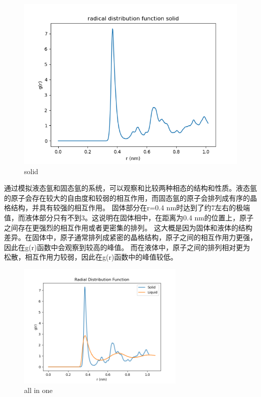 \documentclass[12pt, a4paper, oneside]{ctexart}
\begin{document}
\begin{spacing}{2.0}
\begin{figure}[H]
\begin{minipage}[t]{0.5\linewidth}
        \includegraphics[scale=0.5]{radial distribution function solid.png}
        \caption{solid}
        \label{fig:side:b}
      \end{minipage}
\end{figure}


通过模拟液态氩和固态氩的系统，可以观察和比较两种相态的结构和性质。液态氩的原子会存在较大的自由度和较弱的相互作用，而固态氩的原子会排列成有序的晶格结构，并具有较强的相互作用。
固体部分在r=0.4 nm时达到了约7左右的极端值，而液体部分只有不到3。这说明在固体相中，在距离为0.4 nm的位置上，原子之间存在更强烈的相互作用或者更密集的排列。
这大概是因为固体和液体的结构差异。在固体中，原子通常排列成紧密的晶格结构，原子之间的相互作用力更强，因此在g(r)函数中会观察到较高的峰值。
而在液体中，原子之间的排列相对更为松散，相互作用力较弱，因此在g(r)函数中的峰值较低。
\begin{figure}[H]
	\centering
	\includegraphics[width=8cm]{Radial Distribution Function2.png}
	\caption{all in one}
\end{figure}


\end{spacing}
\end{document}
